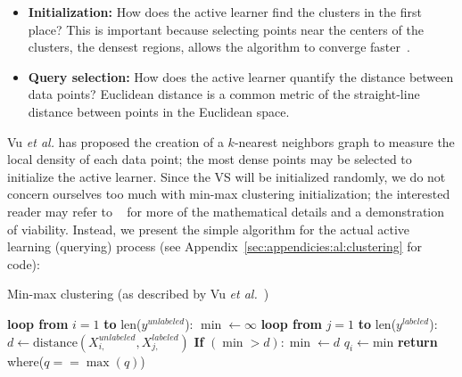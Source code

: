 \tablespacing
\begin{itemize}
	\item \textbf{Initialization:} How does the active learner find the 
	clusters in the first place? This is important because selecting points 
	near the centers of the clusters, the densest regions, allows the algorithm 
	to converge faster~\cite{vu2010}.
	\item \textbf{Query selection:} How does the active learner quantify the 
	distance between data points? Euclidean distance is a common metric of the 
	straight-line distance between points in the Euclidean space.
\end{itemize}
\bodyspacing

Vu \textit{et al.} has proposed the creation of a $k$-nearest neighbors graph 
to measure the local density of each data point; the most dense points may be 
selected to initialize the active learner. Since the VS will be initialized 
randomly, we do not concern ourselves too much with min-max clustering 
initialization; the interested reader may refer to ~\cite{vu2010} for more of 
the mathematical details and a demonstration of viability. Instead, we present 
the simple algorithm for the actual active learning (querying) process (see 
Appendix~\ref{sec:appendicies:al:clustering} for code):

\tablespacing
\begin{algorithm}[H]
	\caption{Min-max clustering (as described by 
		Vu \textit{et al.}~\cite{vu2010})}\label{alg:al:methods:clustering}
	\begin{algorithmic}[1]
		\State \textbf{loop from} $i=1$ \textbf{to} len($y^{unlabeled}$):
		\State \indent $\min \gets \infty$
		\State \indent \textbf{loop from} $j=1$ \textbf{to} len($y^{labeled}$):
		\State \indent \indent  $d \gets \text{distance}(X_{i,}^{unlabeled}, 
		X_{j,}^{labeled})$
		\State \indent \indent \textbf{If} $(\min >d): \min \gets d$
		\State \indent $q_i \gets \text{min}$
		\State \textbf{return} where($q==\max{(q)}$)
		\EndProcedure
	\end{algorithmic}
\end{algorithm}
\bodyspacing